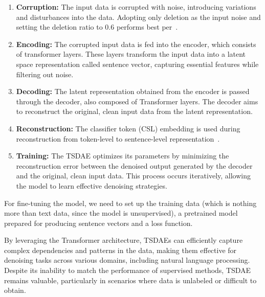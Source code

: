 \documentclass[fleqn,moreauthors,10pt]{ds_report}
\begin{document}
\begin{enumerate}
    \item \textbf{Corruption:} The input data is corrupted with noise, introducing variations and disturbances into the data. Adopting only deletion as the input noise and setting the deletion ratio to 0.6 performs best per~\cite{wang2021tsdae}.
    \item \textbf{Encoding:} The corrupted input data is fed into the encoder, which consists of transformer layers. These layers transform the input data into a latent space representation called sentence vector, capturing essential features while filtering out noise.
    \item \textbf{Decoding:} The latent representation obtained from the encoder is passed through the decoder, also composed of Transformer layers. The decoder aims to reconstruct the original, clean input data from the latent representation.
    \item \textbf{Reconstruction:} The classifier token (CSL) embedding is used during reconstruction from token-level to sentence-level representation~\cite{pinecone_2021}.
    \item \textbf{Training:} The TSDAE optimizes its parameters by minimizing the reconstruction error between the denoised output generated by the decoder and the original, clean input data. This process occurs iteratively, allowing the model to learn effective denoising strategies.
\end{enumerate}

For fine-tuning the model, we need to set up the training data (which is nothing more than text data, since the model is unsupervised), a pretrained model prepared for producing sentence vectors and a loss function.

By leveraging the Transformer architecture, TSDAEs can efficiently capture complex dependencies and patterns in the data, making them effective for denoising tasks across various domains, including natural language processing. Despite its inability to match the performance of supervised methods, TSDAE remains valuable, particularly in scenarios where data is unlabeled or difficult to obtain.


\end{document}

